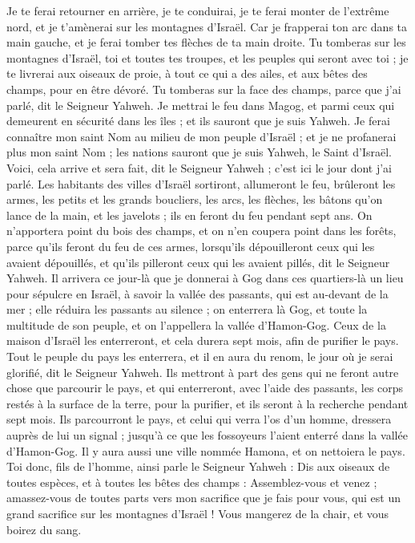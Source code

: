\begin{multicols}{2}
Je te ferai retourner en arrière, je te conduirai, je te ferai monter de l’extrême nord, et je t’amènerai sur les montagnes d’Israël.
Car je frapperai ton arc dans ta main gauche, et je ferai tomber tes flèches de ta main droite.
Tu tomberas sur les montagnes d'Israël, toi et toutes tes troupes, et les peuples qui seront avec toi ; je te livrerai aux oiseaux de proie, à tout ce qui a des ailes, et aux bêtes des champs, pour en être dévoré.
Tu tomberas sur la face des champs, parce que j'ai parlé, dit le Seigneur Yahweh.
Je mettrai le feu dans Magog, et parmi ceux qui demeurent en sécurité dans les îles ; et ils sauront que je suis Yahweh.
Je ferai connaître mon saint Nom au milieu de mon peuple d'Israël ; et je ne profanerai plus mon saint Nom ; les nations sauront que je suis Yahweh, le Saint d’Israël.
Voici, cela arrive et  sera  fait, dit le Seigneur Yahweh ; c'est ici le jour dont j'ai parlé.
Les habitants des villes d'Israël sortiront, allumeront le feu, brûleront les armes, les petits et les grands boucliers, les arcs, les flèches, les bâtons qu'on lance de la main, et les javelots ; ils en feront du feu pendant sept ans.
On n'apportera point du bois des champs, et on n'en coupera point dans les forêts, parce qu'ils feront du feu de ces armes, lorsqu'ils dépouilleront ceux qui les avaient dépouillés, et qu'ils pilleront ceux qui les avaient pillés, dit le Seigneur Yahweh.
Il arrivera ce jour-là que je donnerai à Gog dans ces quartiers-là un lieu pour sépulcre en Israël, à savoir la vallée des passants, qui est au-devant de la mer ; elle réduira les passants au silence ; on enterrera là Gog, et toute la multitude de son peuple, et on l'appellera la vallée d'Hamon-Gog\FTNT{}.
Ceux de la maison d'Israël les enterreront, et cela durera sept mois, afin de purifier le pays.
Tout le peuple du pays les enterrera, et il en aura du renom, le jour où je serai glorifié, dit le Seigneur Yahweh.
Ils mettront à part des gens qui ne feront autre chose que parcourir le pays, et qui enterreront, avec l’aide des passants, les corps restés à la surface de la terre, pour la purifier, et ils seront à la recherche pendant sept mois.
Ils parcourront le pays, et celui qui verra l'os d'un homme, dressera auprès de lui un signal ; jusqu'à ce que les fossoyeurs l'aient enterré dans la vallée d'Hamon-Gog.
Il y aura aussi une ville nommée Hamona\FTNT{}, et on nettoiera le pays.
Toi donc, fils de l’homme, ainsi parle le Seigneur Yahweh : Dis aux oiseaux de toutes espèces, et à toutes les bêtes des champs : Assemblez-vous et venez ; amassez-vous de toutes parts vers mon sacrifice que je fais pour vous, qui est un grand sacrifice sur les montagnes d'Israël ! Vous mangerez de la chair, et vous boirez du sang.

\end{multicols}
